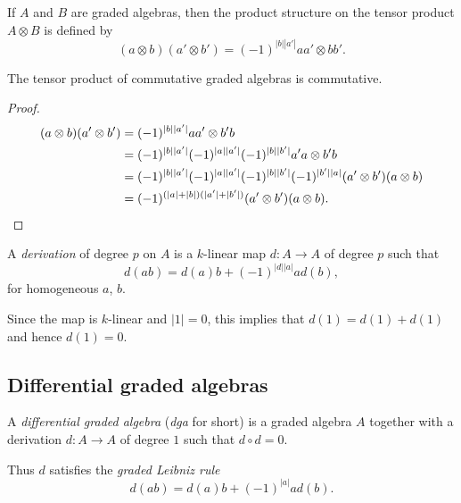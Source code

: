 \documentclass[english,no-theorem-numbers]{short-notes}
\newcommand\degree[1]{|#1|}
\begin{document}
\begin{Def}
    If $A$ and $B$ are graded algebras, then the product structure on the tensor product $A \otimes B$ is defined by
    \[
    (a \otimes b)(a' \otimes b') = (-1)^{\degree b \degree{a'}} aa' \otimes bb'.
    \]
\end{Def}

\begin{Prop}
    The tensor product of commutative graded algebras is commutative.
\end{Prop}
\begin{proof}
    \begin{align*}
    (a \otimes b)(a' \otimes b') & = 
    (-1)^{\degree b \degree{a'}} aa' \otimes b'b \\ & = 
    (-1)^{\degree b \degree{a'}}(-1)^{\degree a \degree{a'}} (-1)^{\degree b \degree{b'}} a'a \otimes b'b \\ & =
    (-1)^{\degree b \degree{a'}}(-1)^{\degree a \degree{a'}} (-1)^{\degree b \degree{b'}} (-1)^{\degree{b'} \degree a} (a' \otimes b')(a \otimes b) \\ & =
    (-1)^{(\degree a + \degree b)(\degree{a'} + \degree{b'})} (a' \otimes b')(a \otimes b).
    \qedhere
    \end{align*}
\end{proof}

\begin{Def}[Derivation]
A \emph{derivation} of degree $p$ on $A$ is a $k$-linear map $d\colon A → A$ of degree $p$ such that
\[
d(ab) = d(a)b + (-1)^{\degree d \degree a} a d(b),
\]
for homogeneous $a$, $b$.
\end{Def}
Since the map is $k$-linear and $\degree 1 = 0$, this implies that $d(1) = d(1) + d(1)$ and hence $d(1) = 0$.

\subsection{Differential graded algebras}

\begin{Def}[DGA]
    A \emph{differential graded algebra} (\emph{dga} for short) is a graded algebra $A$ together with a derivation $d\colon A → A$ of degree $1$ such that $d ∘ d = 0$.
\end{Def}
Thus $d$ satisfies the \emph{graded Leibniz rule} 
\[
d(ab) = d(a)b + (-1)^{\degree a} ad(b).
\]
\end{document}
